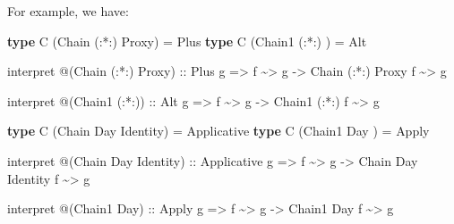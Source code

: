 \documentclass[]{article}
\newenvironment{Shaded}{}{}
\newcommand{\DataTypeTok}[1]{\textcolor[rgb]{0.56,0.13,0.00}{#1}}
\newcommand{\KeywordTok}[1]{\textcolor[rgb]{0.00,0.44,0.13}{\textbf{#1}}}
\newcommand{\NormalTok}[1]{#1}
\newcommand{\OperatorTok}[1]{\textcolor[rgb]{0.40,0.40,0.40}{#1}}
\newcommand{\OtherTok}[1]{\textcolor[rgb]{0.00,0.44,0.13}{#1}}
\begin{document}
\begin{itemize}
  For example, we have:

\begin{Shaded}
\begin{Highlighting}[]
\KeywordTok{type} \DataTypeTok{C}\NormalTok{ (}\DataTypeTok{Chain}\NormalTok{  (}\OperatorTok{:*:}\NormalTok{) }\DataTypeTok{Proxy}\NormalTok{) }\OtherTok{=} \DataTypeTok{Plus}
\KeywordTok{type} \DataTypeTok{C}\NormalTok{ (}\DataTypeTok{Chain1}\NormalTok{ (}\OperatorTok{:*:}\NormalTok{)      ) }\OtherTok{=} \DataTypeTok{Alt}

\NormalTok{interpret }\OperatorTok{@}\NormalTok{(}\DataTypeTok{Chain}\NormalTok{ (}\OperatorTok{:*:}\NormalTok{) }\DataTypeTok{Proxy}\NormalTok{)}
\OtherTok{    ::} \DataTypeTok{Plus}\NormalTok{ g}
    \OtherTok{=>}\NormalTok{ f }\OperatorTok{\textasciitilde{}>}\NormalTok{ g}
    \OtherTok{{-}>} \DataTypeTok{Chain}\NormalTok{ (}\OperatorTok{:*:}\NormalTok{) }\DataTypeTok{Proxy}\NormalTok{ f }\OperatorTok{\textasciitilde{}>}\NormalTok{ g}

\NormalTok{interpret }\OperatorTok{@}\NormalTok{(}\DataTypeTok{Chain1}\NormalTok{ (}\OperatorTok{:*:}\NormalTok{))}
\OtherTok{    ::} \DataTypeTok{Alt}\NormalTok{ g}
    \OtherTok{=>}\NormalTok{ f }\OperatorTok{\textasciitilde{}>}\NormalTok{ g}
    \OtherTok{{-}>} \DataTypeTok{Chain1}\NormalTok{ (}\OperatorTok{:*:}\NormalTok{) f }\OperatorTok{\textasciitilde{}>}\NormalTok{ g}

\KeywordTok{type} \DataTypeTok{C}\NormalTok{ (}\DataTypeTok{Chain}  \DataTypeTok{Day} \DataTypeTok{Identity}\NormalTok{) }\OtherTok{=} \DataTypeTok{Applicative}
\KeywordTok{type} \DataTypeTok{C}\NormalTok{ (}\DataTypeTok{Chain1} \DataTypeTok{Day}\NormalTok{         ) }\OtherTok{=} \DataTypeTok{Apply}

\NormalTok{interpret }\OperatorTok{@}\NormalTok{(}\DataTypeTok{Chain} \DataTypeTok{Day} \DataTypeTok{Identity}\NormalTok{)}
\OtherTok{    ::} \DataTypeTok{Applicative}\NormalTok{ g}
    \OtherTok{=>}\NormalTok{ f }\OperatorTok{\textasciitilde{}>}\NormalTok{ g}
    \OtherTok{{-}>} \DataTypeTok{Chain} \DataTypeTok{Day} \DataTypeTok{Identity}\NormalTok{ f }\OperatorTok{\textasciitilde{}>}\NormalTok{ g}

\NormalTok{interpret }\OperatorTok{@}\NormalTok{(}\DataTypeTok{Chain1} \DataTypeTok{Day}\NormalTok{)}
\OtherTok{    ::} \DataTypeTok{Apply}\NormalTok{ g}
    \OtherTok{=>}\NormalTok{ f }\OperatorTok{\textasciitilde{}>}\NormalTok{ g}
    \OtherTok{{-}>} \DataTypeTok{Chain1} \DataTypeTok{Day}\NormalTok{ f }\OperatorTok{\textasciitilde{}>}\NormalTok{ g}


\end{Highlighting}
\end{Shaded}
\end{itemize}
\end{document}
